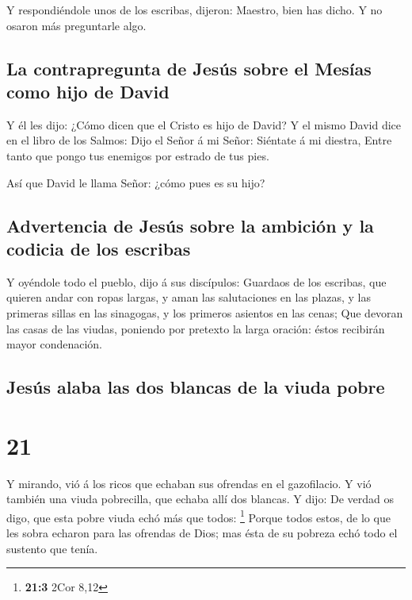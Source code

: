  Y respondiéndole unos de los escribas, dijeron: Maestro,
bien has dicho.  Y no osaron más preguntarle algo.

\hypertarget{la-contrapregunta-de-jesuxfas-sobre-el-mesuxedas-como-hijo-de-david}{%
\subsection{La contrapregunta de Jesús sobre el Mesías como hijo de
David}\label{la-contrapregunta-de-jesuxfas-sobre-el-mesuxedas-como-hijo-de-david}}

 Y él les dijo: ¿Cómo dicen que el Cristo es hijo de
David?  Y el mismo David dice en el libro de los Salmos:
Dijo el Señor á mi Señor: Siéntate á mi diestra,  Entre
tanto que pongo tus enemigos por estrado de tus pies.

 Así que David le llama Señor: ¿cómo pues es su hijo?

\hypertarget{advertencia-de-jesuxfas-sobre-la-ambiciuxf3n-y-la-codicia-de-los-escribas}{%
\subsection{Advertencia de Jesús sobre la ambición y la codicia de los
escribas}\label{advertencia-de-jesuxfas-sobre-la-ambiciuxf3n-y-la-codicia-de-los-escribas}}

 Y oyéndole todo el pueblo, dijo á sus discípulos:
 Guardaos de los escribas, que quieren andar con ropas
largas, y aman las salutaciones en las plazas, y las primeras sillas en
las sinagogas, y los primeros asientos en las cenas;  Que
devoran las casas de las viudas, poniendo por pretexto la larga oración:
éstos recibirán mayor condenación.

\hypertarget{jesuxfas-alaba-las-dos-blancas-de-la-viuda-pobre}{%
\subsection{Jesús alaba las dos blancas de la viuda
pobre}\label{jesuxfas-alaba-las-dos-blancas-de-la-viuda-pobre}}

\hypertarget{section-20}{%
\section{21}\label{section-20}}

 Y mirando, vió á los ricos que echaban sus ofrendas en el
gazofilacio.  Y vió también una viuda pobrecilla, que
echaba allí dos blancas.  Y dijo: De verdad os digo, que
esta pobre viuda echó más que todos: \footnote{\textbf{21:3} 2Cor 8,12}
 Porque todos estos, de lo que les sobra echaron para las
ofrendas de Dios; mas ésta de su pobreza echó todo el sustento que
tenía.

